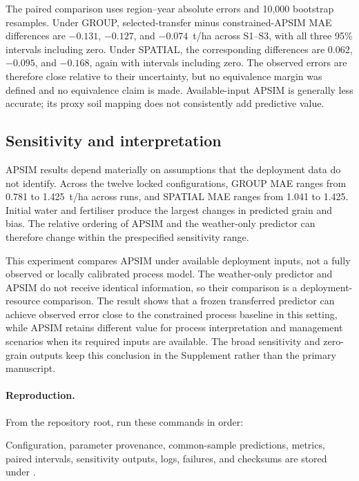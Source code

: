\documentclass[runningheads]{venue/lncs/llncs}
\begin{document}
The paired comparison uses region--year absolute errors and 10,000 bootstrap resamples. Under GROUP, selected-transfer minus constrained-APSIM MAE differences are $-0.131$, $-0.127$, and $-0.074$~t/ha across S1--S3, with all three 95\% intervals including zero. Under SPATIAL, the corresponding differences are 0.062, $-0.095$, and $-0.168$, again with intervals including zero. The observed errors are therefore close relative to their uncertainty, but no equivalence margin was defined and no equivalence claim is made. Available-input APSIM is generally less accurate; its proxy soil mapping does not consistently add predictive value.



\subsection{Sensitivity and interpretation}

APSIM results depend materially on assumptions that the deployment data do not identify. Across the twelve locked configurations, GROUP MAE ranges from 0.781 to 1.425~t/ha across runs, and SPATIAL MAE ranges from 1.041 to 1.425. Initial water and fertiliser produce the largest changes in predicted grain and bias. The relative ordering of APSIM and the weather-only predictor can therefore change within the prespecified sensitivity range.



This experiment compares APSIM under available deployment inputs, not a fully observed or locally calibrated process model. The weather-only predictor and APSIM do not receive identical information, so their comparison is a deployment-resource comparison. The result shows that a frozen transferred predictor can achieve observed error close to the constrained process baseline in this setting, while APSIM retains different value for process interpretation and management scenarios when its required inputs are available. The broad sensitivity and zero-grain outputs keep this conclusion in the Supplement rather than the primary manuscript.

\paragraph{Reproduction.} From the repository root, run these commands in order:
\begin{quote}\small\ttfamily
{}\par
{}\par
{}\par
{}
\end{quote}
Configuration, parameter provenance, common-sample predictions, metrics, paired intervals, sensitivity outputs, logs, failures, and checksums are stored under .
\end{document}
